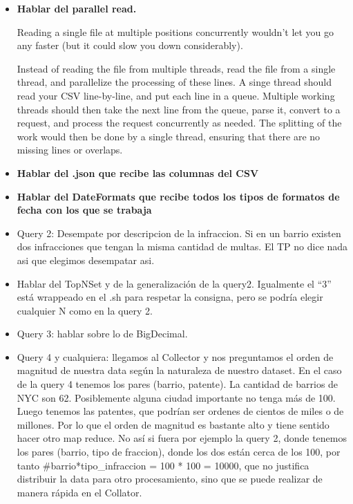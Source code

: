 \documentclass[a4paper,12pt]{article}
\begin{document}
	\begin{itemize}
		\item \textbf{Hablar del parallel read.}
		
		Reading a single file at multiple positions concurrently wouldn't let you go any faster (but it could slow you down considerably).
		
		Instead of reading the file from multiple threads, read the file from a single thread, and parallelize the processing of these lines. A singe thread should read your CSV line-by-line, and put each line in a queue. Multiple working threads should then take the next line from the queue, parse it, convert to a request, and process the request concurrently as needed. The splitting of the work would then be done by a single thread, ensuring that there are no missing lines or overlaps. 
		
		\item \textbf{Hablar del .json que recibe las columnas del CSV}
		
		\item \textbf{Hablar del DateFormats que recibe todos los tipos de formatos de fecha con los que se trabaja}
		
		\item Query 2: Desempate por descripcion de la infraccion. Si en un barrio existen dos infracciones que tengan la misma cantidad de multas. El TP no dice nada asi que elegimos desempatar asi. 
		
		\item Hablar del TopNSet y de la generalización de la query2. Igualmente el ``3'' está wrappeado en el .sh para respetar la consigna, pero se podría elegir cualquier N como en la query 2.
		
		\item Query 3: hablar sobre lo de BigDecimal.
		
		\item Query 4 y cualquiera: llegamos al Collector y nos preguntamos el orden de magnitud de nuestra data según la naturaleza de nuestro dataset. En el caso de la query 4 tenemos los pares (barrio, patente). La cantidad de barrios de NYC son 62. Posiblemente alguna ciudad importante no tenga más de 100. Luego tenemos las patentes, que podrían ser ordenes de cientos de miles o de millones. Por lo que el orden de magnitud es bastante alto y tiene sentido hacer otro map reduce. No así si fuera por ejemplo la query 2, donde tenemos los pares (barrio, tipo de fraccion), donde los dos están cerca de los 100, por tanto \#barrio*tipo\_infraccion = 100 * 100 = 10000, que no justifica distribuir la data para otro procesamiento, sino que se puede realizar de manera rápida en el Collator.
	\end{itemize}
	
	
\end{document}
